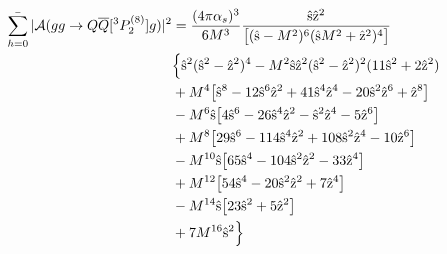 \documentclass[aps,prc,preprint,superscriptaddress,showpacs,showkeys,amsmath]{revtex4-1}
\begin{document}
\begin{itemize}
\begin{equation}
\begin{split}
\mathop{{\bar{\sum_{h=0}}}} | {\cal A}(gg \to Q{\overline Q}[ ^3P_2^{(8)}] g) |^2  &={(4\pi {\alpha_{s}})^3 \over 6 M^3} \frac{ \hat{\rm s} \hat{\rm z}^2}{\bigl[(\hat{\rm s}-M^2)^6 (\hat{\rm s} M^2 + \hat{\rm z}^2)^4 \bigr]}\\
                                                               & \Bigl\{ \hat{\rm s}^2 (\hat{\rm s}^2-\hat{\rm z}^2)^4 - M^2 \hat{\rm s} \hat{\rm z}^2 (\hat{\rm s}^2-\hat{\rm z}^2)^2(11 \hat{\rm s}^2+2 \hat{\rm z}^2) \\
                                                               & + M^4 \bigl[ \hat{\rm s}^8 - 12 \hat{\rm s}^6 \hat{\rm z}^2 + 41 \hat{\rm s}^4 \hat{\rm z}^4 - 20 \hat{\rm s}^2 \hat{\rm z}^6 + \hat{\rm z}^8 \bigr] \\
                                                               & - M^6 \hat{\rm s} \bigl[ 4\hat{\rm s}^6 - 26 \hat{\rm s}^4 \hat{\rm z}^2 - \hat{\rm s}^2 \hat{\rm z}^4 - 5 \hat{\rm z}^6 \bigr] \\
                                                               & + M^8 \bigl[ 29 \hat{\rm s}^6 - 114 \hat{\rm s}^4 \hat{\rm z}^2 + 108 \hat{\rm s}^2 \hat{\rm z}^4 - 10 \hat{\rm z}^6 \bigr] \\
                                                               & - M^{10} \hat{\rm s} \bigl[ 65 \hat{\rm s}^4 - 104 \hat{\rm s}^2 \hat{\rm z}^2 -33 \hat{\rm z}^4 \bigr] \\
                                                               & + M^{12} \bigl[ 54 \hat{\rm s}^4 - 20 \hat{\rm s}^2 \hat{\rm z}^2 + 7 \hat{\rm z}^4 \bigr] \\
                                                               & - M^{14} \hat{\rm s} \bigl[23 \hat{\rm s}^2 + 5 \hat{\rm z}^2\bigr]\\ 
                                                               & + 7 M^{16} \hat{\rm s}^2 \Bigr\}
\end{split}  
\end{equation}



\end{itemize}
\end{document}
